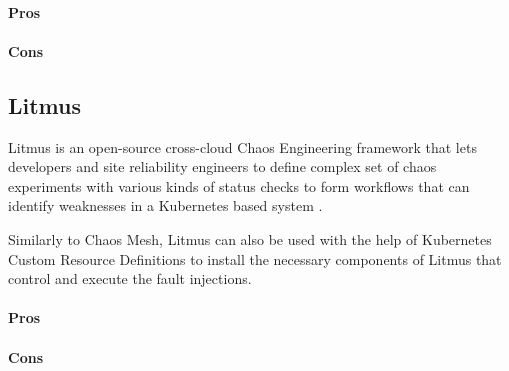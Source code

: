 \paragraph{Pros}

\paragraph{Cons}

\subsection{Litmus}

Litmus is an open-source cross-cloud Chaos Engineering framework that lets developers and site reliability engineers to define complex set of chaos experiments with various kinds of status checks to form workflows that can identify weaknesses in a Kubernetes based system \cite{Litmus}.

Similarly to Chaos Mesh, Litmus can also be used with the help of Kubernetes Custom Resource Definitions to install the necessary components of Litmus that control and execute the fault injections.

\paragraph{Pros}

\paragraph{Cons}
